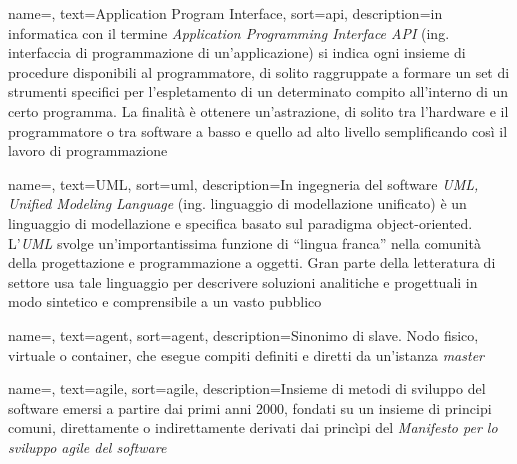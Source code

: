 
    


{
    name=,
    text=Application Program Interface,
    sort=api,
    description={in informatica con il termine \emph{Application Programming Interface API} (ing. interfaccia di programmazione di un'applicazione) si indica ogni insieme di procedure disponibili al programmatore, di solito raggruppate a formare un set di strumenti specifici per l'espletamento di un determinato compito all'interno di un certo programma. La finalità è ottenere un'astrazione, di solito tra l'hardware e il programmatore o tra software a basso e quello ad alto livello semplificando così il lavoro di programmazione}
}

{
    name=,
    text=UML,
    sort=uml,
    description={In ingegneria del software \emph{UML, Unified Modeling Language} (ing. linguaggio di modellazione unificato) è un linguaggio di modellazione e specifica basato sul paradigma object-oriented. L'\emph{UML} svolge un'importantissima funzione di ``lingua franca'' nella comunità della progettazione e programmazione a oggetti. Gran parte della letteratura di settore usa tale linguaggio per descrivere soluzioni analitiche e progettuali in modo sintetico e comprensibile a un vasto pubblico}
}

{
    name=,
    text=agent,
    sort=agent,
    description={Sinonimo di slave. Nodo fisico, virtuale o container, che esegue compiti definiti e diretti da un'istanza \textit{master}}
}

{
    name=,
    text=agile,
    sort=agile,
    description={Insieme di metodi di sviluppo del software emersi a partire dai primi anni 2000, fondati su un insieme di principi comuni, direttamente o indirettamente derivati dai princìpi del \textit{Manifesto per lo sviluppo agile del software\cite{site:agile-manifesto}}}
}

